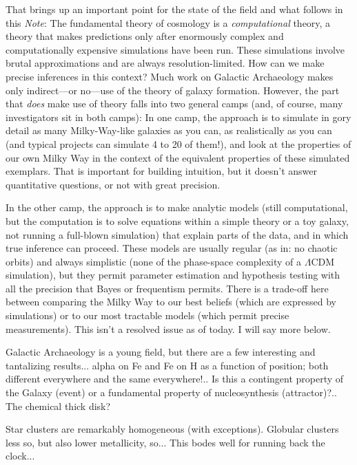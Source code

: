 \documentclass[11pt, letterpaper]{article}
\newcommand{\documentname}{\textsl{Note}}
\begin{document}
That brings up an important point for the state of the field and what
follows in this \documentname: The fundamental theory of cosmology is
a \emph{computational} theory, a theory that makes predictions only
after enormously complex and computationally expensive simulations
have been run. These simulations involve brutal approximations and are
always resolution-limited. How can we make precise inferences in this
context?  Much work on Galactic Archaeology makes only indirect---or
no---use of the theory of galaxy formation. However, the part that
\emph{does} make use of theory falls into two general camps (and, of
course, many investigators sit in both camps): In one camp, the
approach is to simulate in gory detail as many Milky-Way-like galaxies
as you can, as realistically as you can (and typical projects can
simulate 4 to 20 of them!), and look at the properties of our own
Milky Way in the context of the equivalent properties of these
simulated exemplars. That is important for building intuition, but
it doesn't answer quantitative questions, or not with great precision.


In the other camp, the approach is to make analytic models (still
computational, but the computation is to solve equations within a
simple theory or a toy galaxy, not running a full-blown simulation)
that explain parts of the data, and in which true inference can
proceed. These models are usually regular (as in: no chaotic orbits)
and always simplistic (none of the phase-space complexity of a
$\Lambda$CDM simulation), but they permit parameter estimation and
hypothesis testing with all the precision that Bayes or frequentism
permits. There is a trade-off here between comparing the Milky Way to
our best beliefs (which are expressed by simulations) or to our most
tractable models (which permit precise measurements). This isn't a
resolved issue as of today. I will say more below.

Galactic Archaeology is a young field, but there are a few interesting
and tantalizing results... alpha on Fe and Fe on H as a function of
position; both different everywhere and the same everywhere!.. Is this
a contingent property of the Galaxy (event) or a fundamental property
of nucleosynthesis (attractor)?.. The chemical thick disk?

Star clusters are remarkably homogeneous (with exceptions). Globular
clusters less so, but also lower metallicity, so... This bodes well
for running back the clock...
\end{document}
